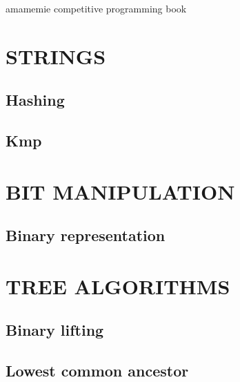 \documentclass[11pt]{article}
\begin{document}
\begin{titlepage}
    \centering
    \vspace*{\fill}
    {\Huge amamemie competitive programming book}
    \vspace*{\fill}
\end{titlepage}

\newpage
\thispagestyle{empty}
\mbox{}

\newpage
\tableofcontents
\newpage

\section{STRINGS}

\subsection{\texorpdfstring{Hashing}{Hashing}}


\subsection{\texorpdfstring{Kmp}{Kmp}}


\section{BIT MANIPULATION}

\subsection{\texorpdfstring{Binary representation}{Binary representation}}


\section{TREE ALGORITHMS}

\subsection{\texorpdfstring{Binary lifting}{Binary lifting}}


\subsection{\texorpdfstring{Lowest common ancestor}{Lowest common ancestor}}

\end{document}
